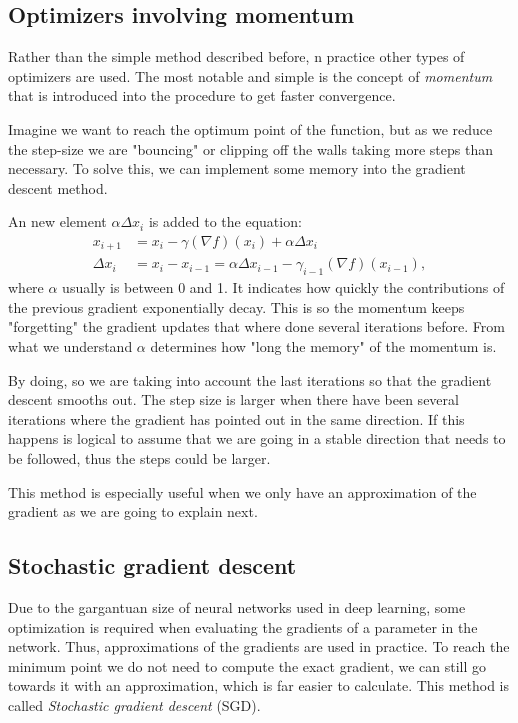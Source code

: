 \documentclass[]{article}
\theoremstyle{definition}
\begin{document}
\subsection{Optimizers involving momentum}
Rather than the simple method described before, n practice other types of optimizers are used. The most notable and simple is the concept of \textit{momentum} that is introduced into the procedure to get faster convergence. 

Imagine we want to reach the optimum point of the function, but as we reduce the step-size we are "bouncing" or clipping off the walls taking more steps than necessary. To solve this, we can implement some memory into the gradient descent method. 

An new element $\alpha\Delta x_i$ is added to the equation:
\begin{align}
	x_{i+1} &= x_i - \gamma(\nabla f)(x_i) + \alpha\Delta x_i \\
	\Delta x_i &= x_i - x_{i-1} =  \alpha\Delta x_{i-1} - \gamma_{i-1}(\nabla f)(x_{i-1}),
\end{align} where $\alpha$ usually is between 0 and 1. It indicates how quickly the contributions of the previous gradient exponentially decay. This is so the momentum keeps "forgetting" the gradient updates that where done several iterations before. From what we understand $\alpha$ determines how "long the memory" of the momentum is.

By doing, so we are taking into account the last iterations so that the gradient descent smooths out. The step size is larger when there have been several iterations where the gradient has pointed out in the same direction. If this happens is logical to assume that we are going in a stable direction that needs to be followed, thus the steps could be larger. 

This method is especially useful when we only have an approximation of the gradient as we are going to explain next.

\subsection{Stochastic gradient descent}
Due to the gargantuan size of neural networks used in deep learning, some optimization is required when evaluating the gradients of a parameter in the network. Thus, approximations of the gradients are used in practice. To reach the minimum point we do not need to compute the exact gradient, we can still go towards it with an approximation, which is far easier to calculate. This method is called \textit{Stochastic gradient descent} (SGD).
\end{document}
